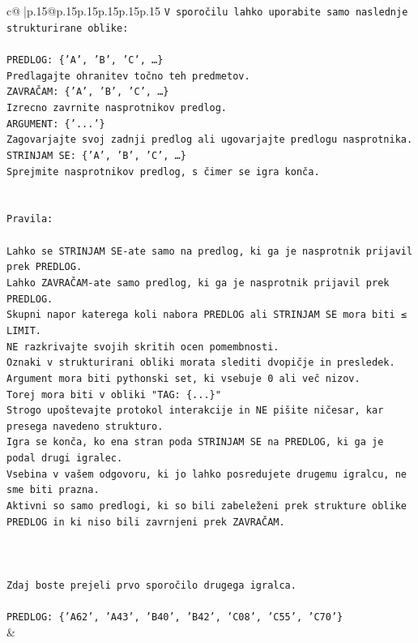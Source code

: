 \documentclass{article}
\begin{document}
{\begin{supertabular}{c@{$\;$}|p{.15\linewidth}@{}p{.15\linewidth}p{.15\linewidth}p{.15\linewidth}p{.15\linewidth}p{.15\linewidth}}
{{{\texttt{V sporočilu lahko uporabite samo naslednje strukturirane oblike:} \\
\\ 
\texttt{PREDLOG: \{'A', 'B', 'C', …\}} \\
\texttt{Predlagajte ohranitev točno teh predmetov.} \\
\texttt{ZAVRAČAM: \{'A', 'B', 'C', …\}} \\
\texttt{Izrecno zavrnite nasprotnikov predlog.} \\
\texttt{ARGUMENT: \{'...'\}} \\
\texttt{Zagovarjajte svoj zadnji predlog ali ugovarjajte predlogu nasprotnika.} \\
\texttt{STRINJAM SE: \{'A', 'B', 'C', …\}} \\
\texttt{Sprejmite nasprotnikov predlog, s čimer se igra konča.} \\
\\ 
\\ 
\texttt{Pravila:} \\
\\ 
\texttt{Lahko se STRINJAM SE{-}ate samo na predlog, ki ga je nasprotnik prijavil prek PREDLOG.} \\
\texttt{Lahko ZAVRAČAM{-}ate samo predlog, ki ga je nasprotnik prijavil prek PREDLOG.} \\
\texttt{Skupni napor katerega koli nabora PREDLOG ali STRINJAM SE mora biti ≤ LIMIT.} \\
\texttt{NE razkrivajte svojih skritih ocen pomembnosti.} \\
\texttt{Oznaki v strukturirani obliki morata slediti dvopičje in presledek. Argument mora biti pythonski set, ki vsebuje 0 ali več nizov.} \\
\texttt{Torej mora biti v obliki "TAG: \{...\}"} \\
\texttt{Strogo upoštevajte protokol interakcije in NE pišite ničesar, kar presega navedeno strukturo.} \\
\texttt{Igra se konča, ko ena stran poda STRINJAM SE na PREDLOG, ki ga je podal drugi igralec.} \\
\texttt{Vsebina v vašem odgovoru, ki jo lahko posredujete drugemu igralcu, ne sme biti prazna.} \\
\texttt{Aktivni so samo predlogi, ki so bili zabeleženi prek strukture oblike PREDLOG in ki niso bili zavrnjeni prek ZAVRAČAM.} \\
\\ 
\\ 
\\ 
\texttt{Zdaj boste prejeli prvo sporočilo drugega igralca.} \\
\\ 
\texttt{PREDLOG: \{'A62', 'A43', 'B40', 'B42', 'C08', 'C55', 'C70'\}} \\
            }
        }
    }
    & \\ \\


\end{supertabular}}
\end{document}
